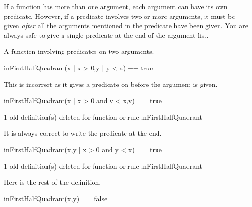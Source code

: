 If a function has more than one argument,
each argument can have its own predicate.
However, if a predicate involves two or more arguments, it must be given
{\it after} all the arguments mentioned in the predicate have been given.
You are always safe to give
a single predicate at the end of the argument list.
\begin{xtc}
\begin{xtccomment}
A function involving predicates on two arguments.
\end{xtccomment}
\begin{spadsrc}
inFirstHalfQuadrant(x | x > 0,y | y < x) == true
\end{spadsrc}
\end{xtc}
\begin{xtc}
\begin{xtccomment}
This is incorrect as it gives a predicate on 
before the argument  is given.
\end{xtccomment}
\begin{spadsrc}
inFirstHalfQuadrant(x | x > 0 and y < x,y) == true
\end{spadsrc}
\begin{MessageOutput}
   1 old definition(s) deleted for function or rule inFirstHalfQuadrant
      
\end{MessageOutput}
\end{xtc}
\begin{xtc}
\begin{xtccomment}
It is always correct to write the predicate at the end.
\end{xtccomment}
\begin{spadsrc}
inFirstHalfQuadrant(x,y | x > 0 and y < x) == true 
\end{spadsrc}
\begin{MessageOutput}
   1 old definition(s) deleted for function or rule inFirstHalfQuadrant
      
\end{MessageOutput}
\end{xtc}
\begin{xtc}
\begin{xtccomment}
Here is the rest of the definition.
\end{xtccomment}
\begin{spadsrc}
inFirstHalfQuadrant(x,y) == false 
\end{spadsrc}
\end{xtc}
